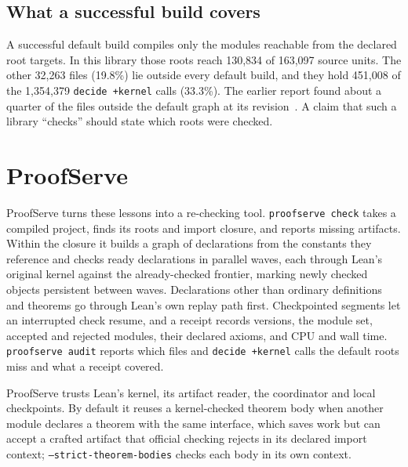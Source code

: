 \documentclass[10pt,twocolumn]{article}
\newcommand{\dk}{\texttt{decide +kernel}}
\begin{document}
\subsection{What a successful build covers}\label{sec:coverage}
A successful default build compiles only the modules reachable from the
declared root targets. In this library those roots reach 130,834 of
163,097 source units. The other 32,263 files (19.8\%) lie outside every
default build, and they hold 451,008 of the 1,354,379 \dk{} calls
(33.3\%). The earlier report found about a quarter of the files outside the
default graph at its revision~\cite{openaiMathTooling2026}. A claim that
such a library ``checks'' should state which roots were checked.

\section{ProofServe}\label{sec:proofserve}
ProofServe turns these lessons into a re-checking tool. \texttt{proofserve
check} takes a compiled project, finds its roots and import closure, and
reports missing artifacts. Within the closure it builds a graph of
declarations from the constants they reference and checks ready
declarations in parallel waves, each through Lean's original kernel against
the already-checked frontier, marking newly checked objects persistent
between waves. Declarations other than ordinary definitions and theorems
go through Lean's own replay path first. Checkpointed segments let an
interrupted check resume, and a receipt records versions, the module set,
accepted and rejected modules, their declared axioms, and CPU and wall
time. \texttt{proofserve audit} reports which files and \dk{} calls the
default roots miss and what a receipt covered.

ProofServe trusts Lean's kernel, its artifact reader, the coordinator and
local checkpoints. By default it reuses a kernel-checked theorem body when
another module declares a theorem with the same interface, which saves
work but can accept a crafted artifact that official checking rejects in
its declared import context; \texttt{--strict-theorem-bodies} checks each
body in its own context.
\end{document}
